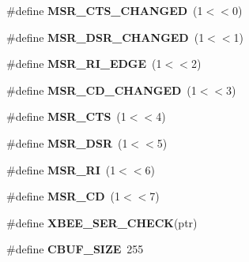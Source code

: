 \begin{DoxyCompactItemize}
\item 
\hypertarget{group__hal__dos_gaf5024a0b85987ce1b19e46609a4023c6}{\#define {\bfseries M\-S\-R\-\_\-\-C\-T\-S\-\_\-\-C\-H\-A\-N\-G\-E\-D}~(1$<$$<$0)}\label{group__hal__dos_gaf5024a0b85987ce1b19e46609a4023c6}

\item 
\hypertarget{group__hal__dos_ga856f1438337659d52d03fee4e37675e9}{\#define {\bfseries M\-S\-R\-\_\-\-D\-S\-R\-\_\-\-C\-H\-A\-N\-G\-E\-D}~(1$<$$<$1)}\label{group__hal__dos_ga856f1438337659d52d03fee4e37675e9}

\item 
\hypertarget{group__hal__dos_ga89a8c65c6f184a528b8efc3762ed7ea8}{\#define {\bfseries M\-S\-R\-\_\-\-R\-I\-\_\-\-E\-D\-G\-E}~(1$<$$<$2)}\label{group__hal__dos_ga89a8c65c6f184a528b8efc3762ed7ea8}

\item 
\hypertarget{group__hal__dos_gacaf7caab8fffc95e513e9e65cef46c97}{\#define {\bfseries M\-S\-R\-\_\-\-C\-D\-\_\-\-C\-H\-A\-N\-G\-E\-D}~(1$<$$<$3)}\label{group__hal__dos_gacaf7caab8fffc95e513e9e65cef46c97}

\item 
\hypertarget{group__hal__dos_ga99bfd5dadd350f9bd1901282bc88bc35}{\#define {\bfseries M\-S\-R\-\_\-\-C\-T\-S}~(1$<$$<$4)}\label{group__hal__dos_ga99bfd5dadd350f9bd1901282bc88bc35}

\item 
\hypertarget{group__hal__dos_gabefbb7ce73e57a43abd7351c33dd81dd}{\#define {\bfseries M\-S\-R\-\_\-\-D\-S\-R}~(1$<$$<$5)}\label{group__hal__dos_gabefbb7ce73e57a43abd7351c33dd81dd}

\item 
\hypertarget{group__hal__dos_ga0960208e3de952801488883144eae96b}{\#define {\bfseries M\-S\-R\-\_\-\-R\-I}~(1$<$$<$6)}\label{group__hal__dos_ga0960208e3de952801488883144eae96b}

\item 
\hypertarget{group__hal__dos_gac94b8604b9ebea796f84bfa89cf79a01}{\#define {\bfseries M\-S\-R\-\_\-\-C\-D}~(1$<$$<$7)}\label{group__hal__dos_gac94b8604b9ebea796f84bfa89cf79a01}

\item 
\hypertarget{group__hal__dos_ga755b7e850db6200a6f43b741c678ae53}{\#define {\bfseries X\-B\-E\-E\-\_\-\-S\-E\-R\-\_\-\-C\-H\-E\-C\-K}(ptr)}\label{group__hal__dos_ga755b7e850db6200a6f43b741c678ae53}

\item 
\hypertarget{group__hal__dos_gae5ad24619d6c5bd6073b2f566f6fc266}{\#define {\bfseries C\-B\-U\-F\-\_\-\-S\-I\-Z\-E}~255}\label{group__hal__dos_gae5ad24619d6c5bd6073b2f566f6fc266}


\end{DoxyCompactItemize}
